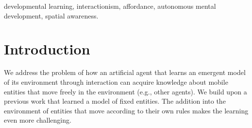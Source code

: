 \documentclass[conference]{IEEEtran}
\begin{document}
\begin{IEEEkeywords}
developmental learning, interactionism, affordance, autonomous mental development, spatial awareness.
\end{IEEEkeywords}

\section{Introduction}\label{intro}

We address the problem of how an artificial agent that learns an emergent model of its environment through interaction can acquire knowledge about mobile entities that move freely in the environment (e.g., other agents).
We build upon a previous work that learned a model of fixed entities. %
The addition into the environment of entities that move according to their own rules makes the learning even more challenging.





\end{document}
